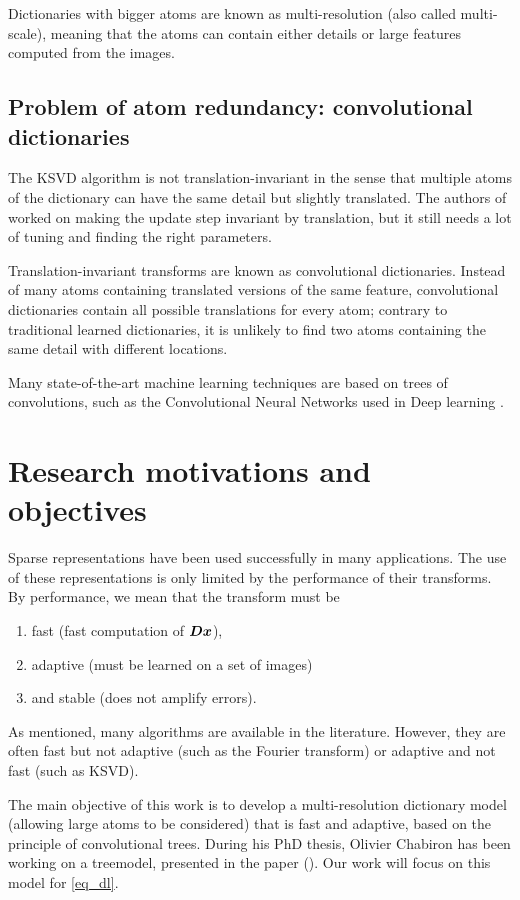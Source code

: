 \noindent
Dictionaries with bigger atoms are known as multi-resolution (also called multi-scale), meaning that the atoms can contain either details or large features computed from the images.


\subsection{Problem of atom redundancy: convolutional dictionaries}\label{sec_atoms_redund}
The \ac{KSVD} algorithm is not translation-invariant in the sense that multiple atoms of the dictionary can have the same detail but slightly translated. The authors of \cite{mailhe_shift-invariant_2008} worked on making the update step invariant by translation, but it still needs a lot of tuning and finding the right parameters.

\noindent
Translation-invariant transforms are known as convolutional dictionaries. Instead of many atoms containing translated versions of the same feature, convolutional dictionaries contain all possible translations for every atom; contrary to traditional learned dictionaries, it is unlikely to find two atoms containing the same detail with different locations.

\noindent
Many state-of-the-art machine learning techniques are based on trees of convolutions, such as the Convolutional Neural Networks used in Deep learning \cite{lecun_deep_2015}.

\section{Research motivations and objectives}
Sparse representations have been used successfully in many applications. The use of these representations is only limited by the performance of their transforms. By performance, we mean that the transform must be
\begin{enumerate}[label=--]
\item fast (fast computation of $\bm{D}\bm{x}$),
\item adaptive (must be learned on a set of images)
\item and stable (does not amplify errors).
\end{enumerate}

\noindent
As mentioned, many algorithms are available in the literature. However, they are often fast but not adaptive (such as the Fourier transform) or adaptive and not fast (such as \ac{KSVD}).

\noindent
The main objective of this work is to develop a multi-resolution dictionary model (allowing large atoms to be considered) that is fast and adaptive, based on the principle of convolutional trees. During his PhD thesis, Olivier Chabiron has been working on a \gls{treemodel}, presented in the paper  (\cite{chabiron_optimization_2016}). Our work will focus on this model for \eqref{eq_dl}.


